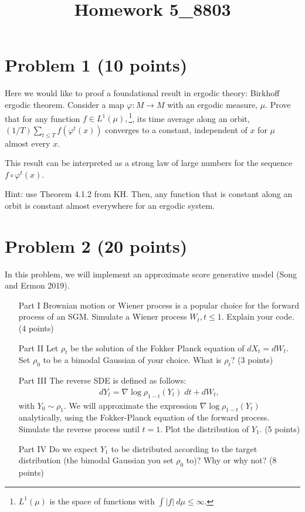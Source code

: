 \documentclass[12pt]{article}
\title{Homework 5_8803}
\begin{document}
\MakeScribeTop
\section{Problem 1 (10 points)}
Here we would like to proof a foundational result in ergodic theory: Birkhoff ergodic theorem. Consider a map $\varphi: M \to M$ with an ergodic measure, $\mu$. Prove that for any function $f \in L^1(\mu),$\footnote{$L^1(\mu)$ is the space of functions with $\int |f| \: d\mu \leq \infty.$}, its time average along an orbit, $(1/T) \sum_{t\leq T} f(\varphi^t(x))$ converges to a constant, independent of $x$ for $\mu$ almost every $x.$ 

This result can be interpreted as a strong law of large numbers for the sequence $f\circ\varphi^t(x)$.

Hint: use Theorem 4.1.2 from KH. Then, any function that is constant along an orbit is constant almost everywhere for an ergodic system. 


\section{Problem 2 (20 points)}

In this problem, we will implement an approximate score generative model (Song and Ermon 2019). 
\begin{itemize}
	\item[Part I] Brownian motion or Wiener process is a popular choice for the forward process of an SGM. Simulate a Wiener process $W_t, t\leq 1.$ Explain your code. (4 points)
	\item[Part II] Let $\rho_t$ be the solution of the Fokker Planck equation of $dX_t = dW_t.$ Set $\rho_0$ to be a bimodal Gaussian of your choice. What is $\rho_t$? (3 points)
	\item[Part III] The reverse SDE is defined as follows:
		\begin{align}
			dY_t = \nabla \log \rho_{1-t}(Y_t) \; dt + dW_t,
		\end{align}
		with $Y_0 \sim \rho_1.$ We will approximate the expression $\nabla \log \rho_{1-t}(Y_t)$ analytically, using the Fokker-Planck equation of the forward process. Simulate the reverse process until $t=1.$ Plot the distribution of $Y_1$. (5 points)
	\item[Part IV] Do we expect $Y_1$ to be distributed according to the target distribution (the bimodal Gaussian you set $\rho_0$ to)? Why or why not? (8 points)

\end{itemize}
\end{document}
